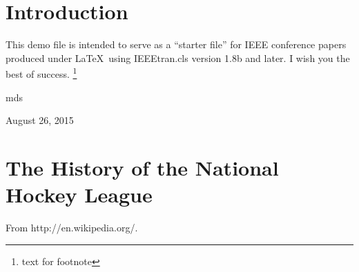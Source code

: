 \documentclass[conference]{IEEEtran}
\begin{document}


\IEEEoverridecommandlockouts
\makeatletter{}\makeatother
{}


\maketitle

\begin{abstract}
The abstract goes here.
\end{abstract}





%
\IEEEpeerreviewmaketitle



\section{Introduction}
This demo file is intended to serve as a ``starter file''
for IEEE conference papers produced under \LaTeX\ using
IEEEtran.cls version 1.8b and later.
I wish you the best of success.
\footnote{text for footnote}

\hfill mds
 
\hfill August 26, 2015


\section{The History of the National Hockey League}
From
http://en.wikipedia.org/.
\end{document}
